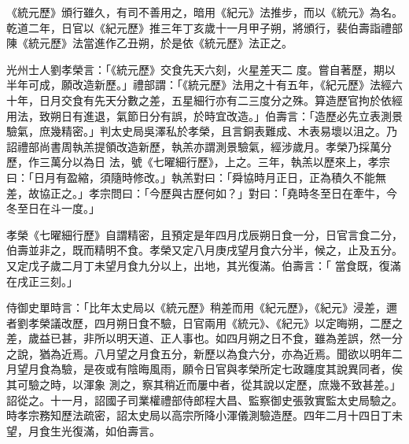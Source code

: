 \begin{pinyinscope}
 《統元歷》頒行雖久，有司不善用之，暗用《紀元》法推步，而以《統元》為名。乾道二年，日官以《紀元歷》推三年丁亥歲十一月甲子朔，將頒行，裴伯壽詣禮部陳《統元歷》法當進作乙丑朔，於是依《統元歷》法正之。



 光州士人劉孝榮言：「《統元歷》交食先天六刻，火星差天二
 度。嘗自著歷，期以半年可成，願改造新歷。」禮部謂：「《統元歷》法用之十有五年，《紀元歷》法經六十年，日月交食有先天分數之差，五星細行亦有二三度分之殊。算造歷官拘於依經用法，致朔日有進退，氣節日分有誤，於時宜改造。」伯壽言：「造歷必先立表測景驗氣，庶幾精密。」判太史局吳澤私於孝榮，且言銅表難成、木表易壞以沮之。乃詔禮部尚書周執羔提領改造新歷，執羔亦謂測景驗氣，經涉歲月。孝榮乃採萬分歷，作三萬分以為日
 法，號《七曜細行歷》，上之。三年，執羔以歷來上，孝宗曰：「日月有盈縮，須隨時修改。」執羔對曰：「舜協時月正日，正為積久不能無差，故協正之。」孝宗問曰：「今歷與古歷何如？」對曰：「堯時冬至日在牽牛，今冬至日在斗一度。」



 孝榮《七曜細行歷》自謂精密，且預定是年四月戊辰朔日食一分，日官言食二分，伯壽並非之，既而精明不食。孝榮又定八月庚戌望月食六分半，候之，止及五分。又定戊子歲二月丁未望月食九分以上，出地，其光復滿。伯壽言：「
 當食既，復滿在戌正三刻。」



 侍御史單時言：「比年太史局以《統元歷》稍差而用《紀元歷》，《紀元》浸差，邇者劉孝榮議改歷，四月朔日食不驗，日官兩用《統元》、《紀元》以定晦朔，二歷之差，歲益已甚，非所以明天道、正人事也。如四月朔之日不食，雖為差誤，然一分之說，猶為近焉。八月望之月食五分，新歷以為食六分，亦為近焉。聞欲以明年二月望月食為驗，是夜或有陰晦風雨，願令日官與孝榮所定七政躔度其說異同者，俟其可驗之時，以渾象
 測之，察其稍近而屢中者，從其說以定歷，庶幾不致甚差。」詔從之。十一月，詔國子司業權禮部侍郎程大昌、監察御史張敦實監太史局驗之。時孝宗務知歷法疏密，詔太史局以高宗所降小渾儀測驗造歷。四年二月十四日丁未望，月食生光復滿，如伯壽言。




\end{pinyinscope}
